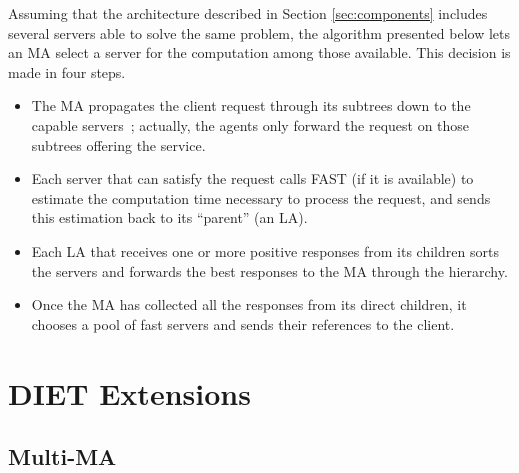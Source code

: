 Assuming that the architecture described in Section
\ref{sec:components} includes several servers able to solve the same
problem, the algorithm presented below lets an MA select a server
for the computation among those available. This decision is made in
four steps.




\begin{itemize}
\item The MA propagates the client request through its subtrees down
  to the capable servers~; actually, the agents only forward the
  request on those subtrees offering the service.
\item Each server that can satisfy the request calls FAST (if it is
  available) to estimate the computation time necessary to process the
  request, and sends this estimation back to its ``parent'' (an LA).
\item Each LA that receives one or more positive responses from its
  children sorts the servers and forwards the best responses to the MA
  through the hierarchy.
\item Once the MA has collected all the responses from its direct
  children, it chooses a pool of fast servers and sends their
  references to the client.
\end{itemize}

\section{DIET Extensions}
\label{sec:extensions}

\subsection{Multi-MA}
\label{init:multima}

